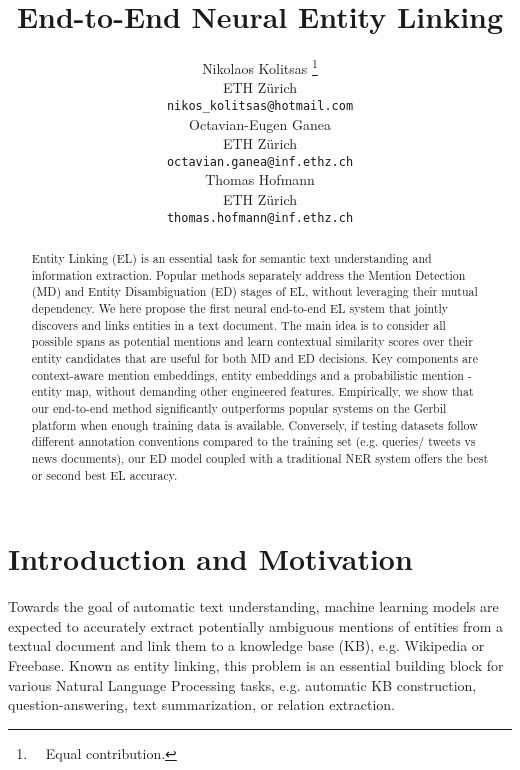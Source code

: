 \documentclass[11pt,a4paper]{article}
\title{End-to-End Neural Entity Linking}
\author{Nikolaos Kolitsas \thanks{\ \ Equal contribution.} \\
  ETH Z\"urich \\
  {\tt nikos\_kolitsas@hotmail.com} \\
  \And
  Octavian-Eugen Ganea \footnotemark[1] \\
  ETH Z\"urich \\
  {\tt octavian.ganea@inf.ethz.ch} \\ 
  \AND
  Thomas Hofmann \\
  ETH Z\"urich \\
  {\tt thomas.hofmann@inf.ethz.ch} \\
}
\date{}
\begin{document}
\maketitle


\newcommand{\mat}[1]{{\mathbf #1}}
\newcommand{\x}{{\mathbf x}}
\newcommand{\I}{{\mathbf I}}
\newcommand{\hyperspace}{{\mathcal X}}
\newcommand{\D}{{\mathbb D}}
\newcommand{\HH}{{\mathbb H}}
\newcommand{\E}{{\mathbb E}}
\newcommand{\M}{{\mathbf M}}
\newcommand{\R}{{\mathbb R}}
\newcommand{\C}{{\mathbb C}}
\newcommand{\z}{{\mathbf z}}
\renewcommand{\Re}{{\mathbb R}}
\newcommand*{\QEDB}{\hfill\ensuremath{\square}}\newcommand{\hi}[1]{\textcolor{red}{#1}}


\begin{abstract}
Entity Linking (EL) is an essential task for semantic text understanding and information extraction. Popular methods separately address the Mention Detection (MD) and Entity Disambiguation (ED) stages of EL, without leveraging their mutual dependency. We here propose the first neural end-to-end EL system that jointly discovers and links entities in a text document. The main idea is to consider all possible spans as potential mentions and learn contextual similarity scores over their entity candidates that are useful for both MD and ED decisions. Key components are context-aware mention embeddings, entity embeddings and a probabilistic mention - entity map, without demanding other engineered features. Empirically, we show that our end-to-end method significantly outperforms popular systems on the Gerbil platform when enough training data is available. Conversely, if testing datasets follow different annotation conventions compared to the training set (e.g. queries/ tweets vs news documents), our ED model coupled with a traditional NER system offers the best or second best EL accuracy.
\end{abstract}

\section{Introduction and Motivation}
Towards the goal of automatic text understanding, machine learning models are expected to accurately extract potentially ambiguous mentions of entities from a textual document and link them to a knowledge base (KB), e.g. Wikipedia or Freebase. Known as entity linking, this problem is an essential building block for various Natural Language Processing tasks, e.g. automatic KB construction, question-answering, text summarization, or relation extraction. 
\end{document}
